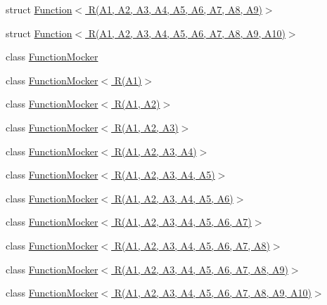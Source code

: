 \begin{DoxyCompactItemize}
\item 
struct \hyperlink{structtesting_1_1internal_1_1_function_3_01_r_07_a1_00_01_a2_00_01_a3_00_01_a4_00_01_a5_00_01_a6dfab3ccde80824a59fc4efd5336a27c1}{Function$<$ R(\+A1, A2, A3, A4, A5, A6, A7, A8, A9)$>$}
\item 
struct \hyperlink{structtesting_1_1internal_1_1_function_3_01_r_07_a1_00_01_a2_00_01_a3_00_01_a4_00_01_a5_00_01_a6f6ff91550f0557b7708e490e5002cd35}{Function$<$ R(\+A1, A2, A3, A4, A5, A6, A7, A8, A9, A10)$>$}
\item 
class \hyperlink{classtesting_1_1internal_1_1_function_mocker}{Function\+Mocker}
\item 
class \hyperlink{classtesting_1_1internal_1_1_function_mocker_3_01_r_07_a1_08_4}{Function\+Mocker$<$ R(\+A1)$>$}
\item 
class \hyperlink{classtesting_1_1internal_1_1_function_mocker_3_01_r_07_a1_00_01_a2_08_4}{Function\+Mocker$<$ R(\+A1, A2)$>$}
\item 
class \hyperlink{classtesting_1_1internal_1_1_function_mocker_3_01_r_07_a1_00_01_a2_00_01_a3_08_4}{Function\+Mocker$<$ R(\+A1, A2, A3)$>$}
\item 
class \hyperlink{classtesting_1_1internal_1_1_function_mocker_3_01_r_07_a1_00_01_a2_00_01_a3_00_01_a4_08_4}{Function\+Mocker$<$ R(\+A1, A2, A3, A4)$>$}
\item 
class \hyperlink{classtesting_1_1internal_1_1_function_mocker_3_01_r_07_a1_00_01_a2_00_01_a3_00_01_a4_00_01_a5_08_4}{Function\+Mocker$<$ R(\+A1, A2, A3, A4, A5)$>$}
\item 
class \hyperlink{classtesting_1_1internal_1_1_function_mocker_3_01_r_07_a1_00_01_a2_00_01_a3_00_01_a4_00_01_a5_00_01_a6_08_4}{Function\+Mocker$<$ R(\+A1, A2, A3, A4, A5, A6)$>$}
\item 
class \hyperlink{classtesting_1_1internal_1_1_function_mocker_3_01_r_07_a1_00_01_a2_00_01_a3_00_01_a4_00_01_a5_00_01_a6_00_01_a7_08_4}{Function\+Mocker$<$ R(\+A1, A2, A3, A4, A5, A6, A7)$>$}
\item 
class \hyperlink{classtesting_1_1internal_1_1_function_mocker_3_01_r_07_a1_00_01_a2_00_01_a3_00_01_a4_00_01_a5_00_01_a6_00_01_a7_00_01_a8_08_4}{Function\+Mocker$<$ R(\+A1, A2, A3, A4, A5, A6, A7, A8)$>$}
\item 
class \hyperlink{classtesting_1_1internal_1_1_function_mocker_3_01_r_07_a1_00_01_a2_00_01_a3_00_01_a4_00_01_a5_00d00d8722bf1ad86ca8049508f133d393}{Function\+Mocker$<$ R(\+A1, A2, A3, A4, A5, A6, A7, A8, A9)$>$}
\item 
class \hyperlink{classtesting_1_1internal_1_1_function_mocker_3_01_r_07_a1_00_01_a2_00_01_a3_00_01_a4_00_01_a5_0038b5baf41d3183579372e0e15a9db969}{Function\+Mocker$<$ R(\+A1, A2, A3, A4, A5, A6, A7, A8, A9, A10)$>$}

\end{DoxyCompactItemize}
